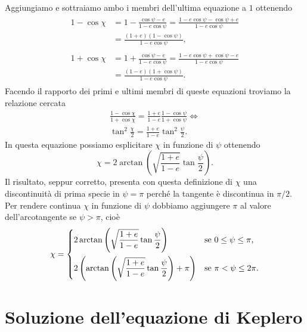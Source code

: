 Aggiungiamo e sottraiamo ambo i membri dell'ultima equazione a $1$ ottenendo
\begin{align}
  \begin{split}
    1-\cos\chi &= 1-\frac{\cos\psi-e}{1-e\cos\psi} =
    \frac{1-e\cos\psi-\cos\psi+e}{1-e\cos\psi} \\
    &= \frac{(1+e)(1-\cos\psi)}{1-e\cos\psi},
  \end{split} \\
  \begin{split}
    1+\cos\chi &= 1+\frac{\cos\psi-e}{1-e\cos\psi} =
    \frac{1-e\cos\psi+\cos\psi-e}{1-e\cos\psi} \\
    &= \frac{(1-e)(1+\cos\psi)}{1-e\cos\psi}.
  \end{split}
\end{align}
Facendo il rapporto dei primi e ultimi membri di queste equazioni troviamo
la relazione cercata
\begin{gather}
  \frac{1-\cos\chi}{1+\cos\chi} = \frac{1+e}{1-e}\frac{1-\cos\psi}{1+\cos\psi}
  \iff \\
  \tan^2\frac{\chi}{2} = \frac{1+e}{1-e}\tan^2\frac{\psi}{2}.
\end{gather}
In questa equazione possiamo esplicitare $\chi$ in funzione di $\psi$ ottenendo
\begin{equation}
  \chi = 2\arctan
  \left(
    \sqrt{\frac{1+e}{1-e}}\tan\frac{\psi}{2}
  \right).
\end{equation}
Il risultato, seppur corretto, presenta con questa definizione di $\chi$ una
discontinuità di prima specie in $\psi = \pi$ perché la tangente è discontinua
in $\pi/2$. Per rendere continua $\chi$ in funzione di $\psi$ dobbiamo
aggiungere $\pi$ al valore dell'arcotangente se $\psi > \pi$, cioè
\begin{equation}
  \label{eq:anoamlie-vera-eccentrica}
  \chi =
  \begin{dcases}
    2\arctan
    \left(
      \sqrt{\frac{1+e}{1-e}}\tan\frac{\psi}{2}
    \right) & \text{se $0 \leq \psi \leq \pi$,} \\
    2
    \left(
      \arctan
      \left(
        \sqrt{\frac{1+e}{1-e}}\tan\frac{\psi}{2}
      \right) + \pi
    \right) & \text{se $\pi < \psi \leq 2\pi$.}
  \end{dcases}
\end{equation}

\section{Soluzione dell'equazione di Keplero}
\label{sec:soluzione-keplero}

